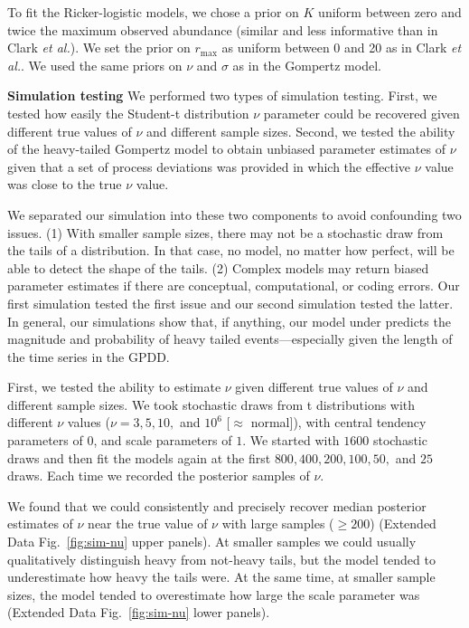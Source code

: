 To fit the Ricker-logistic models, we chose a prior on \(K\) uniform between zero and twice the maximum observed abundance (similar and less informative than in Clark \emph{et al.}\cite{clark2010}). We set the prior on \(r_\mathrm{max}\) as uniform between 0 and 20 as in Clark \emph{et al.}\cite{clark2010}. We used the same priors on \(\nu\) and \(\sigma\) as in the Gompertz model.

\textbf{Simulation testing} We performed two types of simulation testing. First, we tested how easily the Student-t distribution \(\nu\) parameter could be recovered given different true values of \(\nu\) and different sample sizes. Second, we tested the ability of the heavy-tailed Gompertz model to obtain unbiased parameter estimates of \(\nu\) given that a set of process deviations was provided in which the effective \(\nu\) value was close to the true \(\nu\) value.

We separated our simulation into these two components to avoid confounding two issues. (1) With smaller sample sizes, there may not be a stochastic draw from the tails of a distribution. In that case, no model, no matter how perfect, will be able to detect the shape of the tails. (2) Complex models may return biased parameter estimates if there are conceptual, computational, or coding errors. Our first simulation tested the first issue and our second simulation tested the latter. In general, our simulations show that, if anything, our model under predicts the magnitude and probability of heavy tailed events---especially given the length of the time series in the GPDD.

First, we tested the ability to estimate \(\nu\) given different true values of \(\nu\) and different sample sizes. We took stochastic draws from t distributions with different \(\nu\) values (\(\nu = 3, 5, 10,\) and \(10^6\) {[}\(\approx\) normal{]}), with central tendency parameters of \(0\), and scale parameters of \(1\). We started with \(1600\) stochastic draws and then fit the models again at the first \(800, 400, 200, 100, 50,\) and \(25\) draws. Each time we recorded the posterior samples of \(\nu\).

We found that we could consistently and precisely recover median posterior estimates of \(\nu\) near the true value of \(\nu\) with large samples (\(\ge 200\)) (Extended Data Fig.~\ref{fig:sim-nu} upper panels). At smaller samples we could usually qualitatively distinguish heavy from not-heavy tails, but the model tended to underestimate how heavy the tails were. At the same time, at smaller sample sizes, the model tended to overestimate how large the scale parameter was (Extended Data Fig.~\ref{fig:sim-nu} lower panels).

